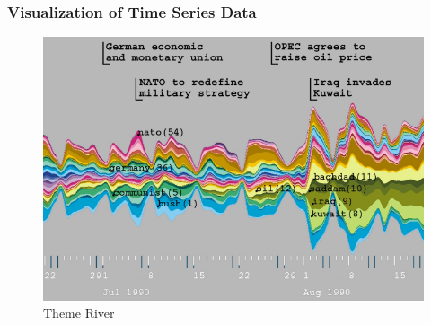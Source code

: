 \documentclass{beamer}
\begin{document}

\begin{frame}
\frametitle{Visualization of Time Series Data}
\begin{figure}
\includegraphics[scale=0.5]{images/havre_themeriver.png}
\caption{Theme River}
\end{figure}
\end{frame}

\end{document}
